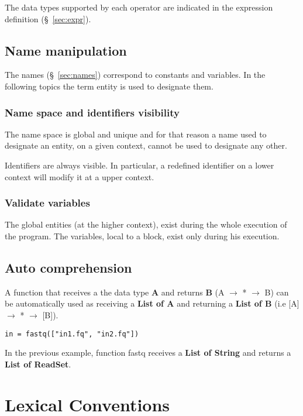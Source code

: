 \documentclass{article}
\begin{document}
The data types supported by each operator are indicated in the expression definition (§~\ref{sec:expr}).

\subsection{Name manipulation}

The names (§~\ref{sec:names}) correspond to constants and variables. In the following topics the term entity is used to designate them.

\subsubsection{Name space and identifiers visibility}

The name space is global and unique and for that reason a name used to designate an entity, on a given context, cannot be used to designate any other.

Identifiers are always visible. In particular, a redefined identifier on a lower context will modify it at a upper context.

\subsubsection{Validate variables}

The global entities (at the higher context), exist during the whole execution of the program. The variables, local to a block, exist only during his execution.


\subsection{Auto comprehension}
A function that receives a the data type \textbf{A} and returns \textbf{B} (A $\rightarrow$ * $\rightarrow$ B) can be automatically used as receiving a \textbf{List of A} and returning a \textbf{List of B} (i.e [A] $\rightarrow$ * $\rightarrow$ [B]).

\begin{verbatim}
in = fastq(["in1.fq", "in2.fq"])
\end{verbatim}

In the previous example, function fastq receives a \textbf{List of String} and returns a \textbf{List of ReadSet}.

\section{Lexical Conventions}
\end{document}
